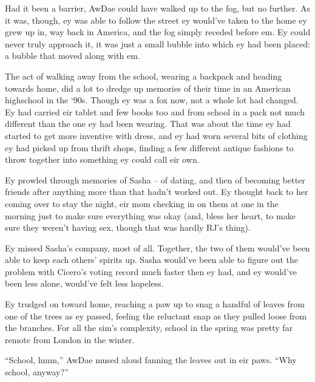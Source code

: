 Had it been a barrier, AwDae could have walked up to the fog, but no further.  As it was, though, ey was able to follow the street ey would've taken to the home ey grew up in, way back in America, and the fog simply receded before em.  Ey could never truly approach it, it was just a small bubble into which ey had been placed: a bubble that moved along with em.

The act of walking away from the school, wearing a backpack and heading towards home, did a lot to dredge up memories of their time in an American highschool in the `90s.  Though ey was a fox now, not a whole lot had changed.  Ey had carried eir tablet and few books too and from school in a pack not much different than the one ey had been wearing.  That was about the time ey had started to get more inventive with dress, and ey had worn several bits of clothing ey had picked up from thrift shops, finding a few different antique fashions to throw together into something ey could call eir own.

Ey prowled through memories of Sasha -- of dating, and then of becoming better friends after anything more than that hadn't worked out.  Ey thought back to her coming over to stay the night, eir mom checking in on them at one in the morning just to make sure everything was okay (and, bless her heart, to make sure they weren't having sex, though that was hardly RJ's thing).

Ey missed Sasha's company, most of all.  Together, the two of them would've been able to keep each others' spirits up.  Sasha would've been able to figure out the problem with Cicero's voting record much faster then ey had, and ey would've been less alone, would've felt less hopeless.

Ey trudged on toward home, reaching a paw up to snag a handful of leaves from one of the trees as ey passed, feeling the reluctant snap as they pulled loose from the branches.  For all the sim's complexity, school in the spring was pretty far remote from London in the winter.

``School, hmm,'' AwDae mused aloud fanning the leaves out in eir paws. ``Why school, anyway?''
